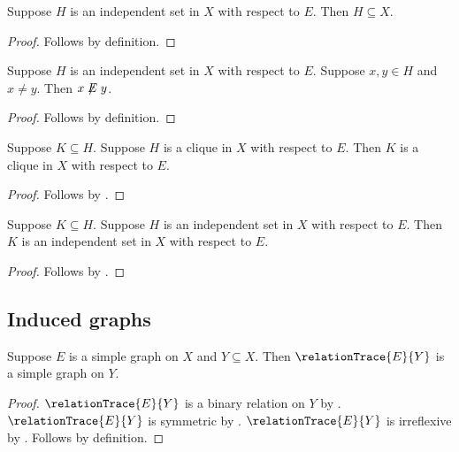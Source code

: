 \begin{proposition}\label{independent_subseteq}
    Suppose $H$ is an independent set in $X$ with respect to $E$.
    Then $H\subseteq X$.
\end{proposition}
\begin{proof}
    Follows by definition.
\end{proof}

\begin{proposition}\label{independent_nonedge}
    Suppose $H$ is an independent set in $X$ with respect to $E$.
    Suppose $x,y\in H$ and $x\neq y$.
    Then $x\not\mathrel{E}y$.
\end{proposition}
\begin{proof}
    Follows by definition.
\end{proof}

\begin{proposition}\label{subset_of_clique_is_clique}
    Suppose $K\subseteq H$.
    Suppose $H$ is a clique in $X$ with respect to $E$.
    Then $K$ is a clique in $X$ with respect to $E$.
\end{proposition}
\begin{proof}
    Follows by .
\end{proof}

\begin{proposition}\label{subset_of_independent_is_independent}
    Suppose $K\subseteq H$.
    Suppose $H$ is an independent set in $X$ with respect to $E$.
    Then $K$ is an independent set in $X$ with respect to $E$.
\end{proposition}
\begin{proof}
    Follows by .
\end{proof}

\subsection{Induced graphs}

\begin{proposition}\label{induced_simple_graph}
    Suppose $E$ is a simple graph on $X$ and $Y\subseteq X$.
    Then $\relationTrace{E}{Y}$ is a simple graph on $Y$.
\end{proposition}
\begin{proof}
    $\relationTrace{E}{Y}$ is a binary relation on $Y$ by
        .
    $\relationTrace{E}{Y}$ is symmetric by
        .
    $\relationTrace{E}{Y}$ is irreflexive by
        .
    Follows by definition.
\end{proof}

